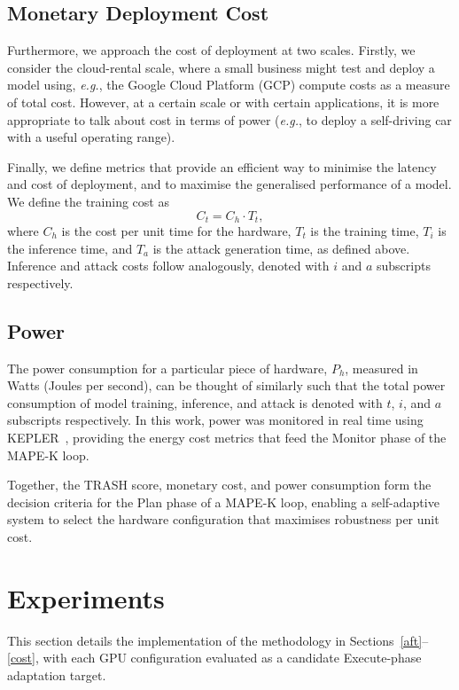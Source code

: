 \documentclass[conference]{IEEEtran}%
\begin{document}
\subsection{Monetary Deployment Cost}

Furthermore, we approach the cost of deployment at two scales. 
Firstly, we consider the cloud-rental scale, where a small business might test and deploy a model using, \textit{e.g.}, the Google Cloud Platform (GCP) compute costs as a measure of total cost. 
However, at a certain scale or with certain applications, it is more appropriate to talk about cost in terms of power (\textit{e.g.}, to deploy a self-driving car with a useful operating range). 

Finally, we define metrics that provide an efficient way to minimise the latency and cost of deployment, and to maximise the generalised performance of a model. We define the training cost as
\[
    C_t = C_h \cdot T_t,
\]
where $C_h$ is the cost per unit time for the hardware, $T_t$ is the training time, $T_i$ is the inference time, and $T_a$ is the attack generation time, as defined above.
Inference and attack costs follow analogously, denoted with $i$ and $a$ subscripts respectively.

\subsection{Power}

The power consumption for a particular piece of hardware, $P_h$, measured in Watts (Joules per second), can be thought of similarly such that the total power consumption of model training, inference, and attack is denoted with $t$, $i$, and $a$ subscripts respectively. 
In this work, power was monitored in real time using KEPLER~\cite{amaral2023kepler}, providing the energy cost metrics that feed the Monitor phase of the MAPE-K loop.

Together, the TRASH score, monetary cost, and power consumption form the decision criteria for the Plan phase of a MAPE-K loop, enabling a self-adaptive system to select the hardware configuration that maximises robustness per unit cost.


\section{Experiments}
\label{experiments}

This section details the implementation of the methodology in Sections~\ref{aft}--\ref{cost}, with each GPU configuration evaluated as a candidate Execute-phase adaptation target.
\end{document}
